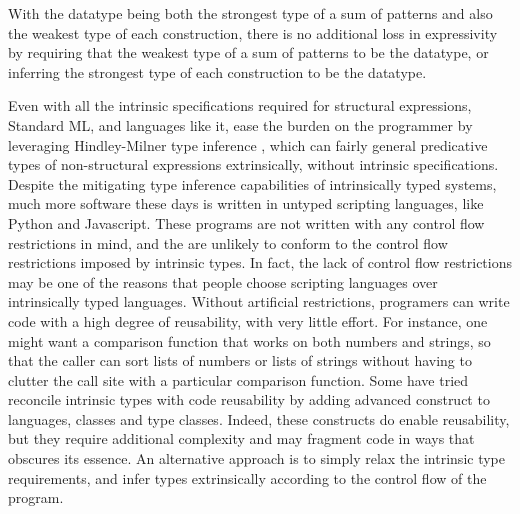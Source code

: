 \documentclass[acmsmall]{acmart}
\theoremstyle{definition}
\begin{document}

\noindent
With the datatype being both the strongest type of a sum of patterns and also the weakest
type of each construction, there is no additional loss in expressivity by
requiring that the weakest type of a sum of patterns to be the datatype, 
or inferring the strongest type of each construction to be the datatype.


Even with all the intrinsic specifications required for structural expressions, Standard ML,
and languages like it, ease the burden on the programmer by leveraging Hindley-Milner
type inference \cite{}, which can fairly general predicative types of 
non-structural expressions extrinsically, without intrinsic specifications. 
Despite the mitigating type inference capabilities of intrinsically typed systems, 
much more software these days is written
in untyped scripting languages, like Python and Javascript. 
These programs are not written with any control flow restrictions in mind,
and the are unlikely to conform to the control flow restrictions imposed by intrinsic types.
In fact, the lack of control flow restrictions may be one of the reasons that people
choose scripting languages over intrinsically typed languages.
Without artificial restrictions, programers can write code with a high degree of reusability,
with very little effort.
For instance, one might want a comparison function that works on both numbers and strings,
so that the caller can sort lists of numbers or lists of strings without having to
clutter the call site with a particular comparison function.  
Some have tried reconcile intrinsic types with code reusability by adding
advanced construct to languages, classes and type classes.
Indeed, these constructs do enable reusability, but they require additional
complexity and may fragment code in ways that obscures its essence.   
An alternative approach is to simply relax the intrinsic type requirements,
and infer types extrinsically according to the control flow of the program. 
\end{document}
